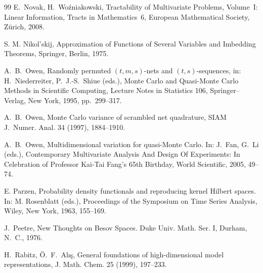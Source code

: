 \documentclass[12pt]{article}
\begin{document}
{\begin{thebibliography}{99}
 E.~Novak, H.~Wo\'{z}niakowski, Tractability of Multivariate Problems, Volume~I: Linear Information, Tracts in Mathematics~6,  European Mathematical Society, Z\"urich, 2008.
  
 S. M. Nikol'skij, Approximation of Functions of Several Variables
and Imbedding Theorems, Springer, Berlin, 1975.

  A.~B.~Owen, Randomly permuted $(t,m,s)$-nets and $(t,s)$-sequences,
  in: H.~Niederreiter, P.~J.-S.~Shiue (eds.), Monte Carlo and
  Quasi-Monte Carlo Methods in Scientific Computing, Lecture Notes
  in Statistics 106, Springer--Verlag, New York, 1995, pp.~299--317.

  A.~B.~Owen, Monte Carlo variance of scrambled net quadrature,
  SIAM J.~Numer. Anal. 34 (1997), 1884--1910.


A.~B.~Owen,  Multidimensional variation for quasi-Monte Carlo. In: J.~Fan, G.~Li (eds.), Contemporary Multivariate Analysis And Design Of Experiments: In Celebration of Professor Kai-Tai Fang's 65th Birthday, World Scientific, 2005, 49--74.

 E. Parzen, Probability density functionals and
  reproducing kernel Hilbert spaces. In: M. Rosenblatt (eds.), Proceedings of the Symposium
  on Time Series Analysis, Wiley, New York,
  1963, 155--169.

 J.~Peetre, New Thoughts on Besov Spaces. Duke Univ. Math. Ser. I,
Durham, N.~C., 1976.



H.~Rabitz, \"O.~F.~Al\i\c{s}, General foundations of high-dimensional model representations,
J. Math. Chem. 25 (1999), 197--233.



\end{thebibliography}}
\end{document}

